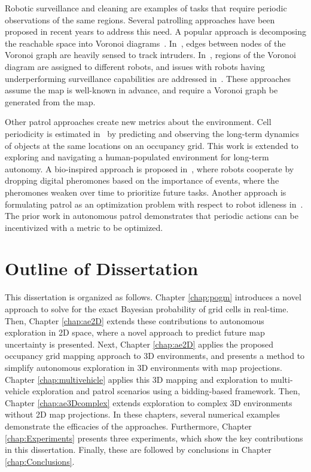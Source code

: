 Robotic surveillance and cleaning are examples of tasks that require periodic observations of the same regions. Several patrolling approaches have been proposed in recent years to address this need. A popular approach is decomposing the reachable space into Voronoi diagrams~\cite{KolCar08,PorRoc10,PipChrWei13}. In~\cite{KolCar08}, edges between nodes of the Voronoi graph are heavily sensed to track intruders. In~\cite{PorRoc10}, regions of the Voronoi diagram are assigned to different robots, and issues with robots having underperforming surveillance capabilities are addressed in~\cite{PipChrWei13}. These approaches assume the map is well-known in advance, and require a Voronoi graph be generated from the map.

Other patrol approaches create new metrics about the environment. Cell periodicity is estimated in~\cite{KraFenCieDonDuc14,KraFenHanDuc16} by predicting and observing the long-term dynamics of objects at the same locations on an occupancy grid. This work is extended to exploring and navigating a human-populated environment for long-term autonomy. A bio-inspired approach is proposed in~\cite{ZhaXia11}, where robots cooperate by dropping digital pheromones based on the importance of events, where the pheromones weaken over time to prioritize future tasks. Another approach is formulating patrol as an optimization problem with respect to robot idleness in~\cite{YanZha16}. The prior work in autonomous patrol demonstrates that periodic actions can be incentivized with a metric to be optimized.


\section{Outline of Dissertation}

This dissertation is organized as follows. Chapter \ref{chap:pogm} introduces a novel approach to solve for the exact Bayesian probability of grid cells in real-time. Then, Chapter \ref{chap:ae2D} extends these contributions to autonomous exploration in 2D space, where a novel approach to predict future map uncertainty is presented. Next, Chapter \ref{chap:ae2D} applies the proposed occupancy grid mapping approach to 3D environments, and presents a method to simplify autonomous exploration in 3D environments with map projections. Chapter \ref{chap:multivehicle} applies this 3D mapping and exploration to multi-vehicle exploration and patrol scenarios using a bidding-based framework. Then, Chapter \ref{chap:ae3Dcomplex} extends exploration to complex 3D environments without 2D map projections. In these chapters, several numerical examples demonstrate the efficacies of the approaches. Furthermore, Chapter \ref{chap:Experiments} presents three experiments, which show the key contributions in this dissertation. Finally, these are followed by conclusions in Chapter \ref{chap:Conclusions}.

